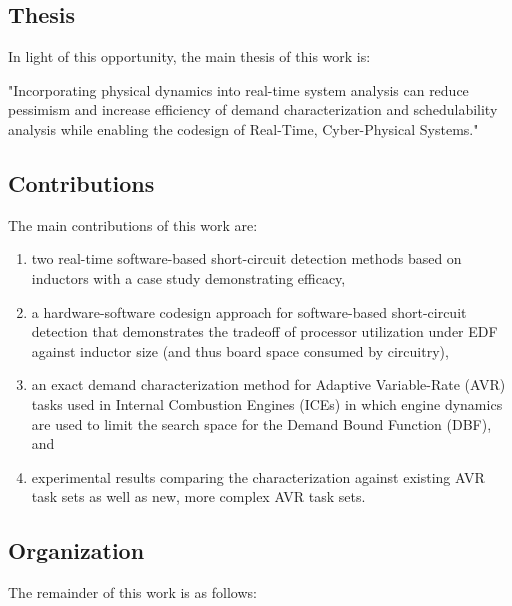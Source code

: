 \subsection{Thesis}

In light of this opportunity, the main thesis of this work is:

"Incorporating physical dynamics into real-time system analysis can reduce pessimism and increase efficiency of demand characterization and schedulability analysis while enabling the codesign of Real-Time, Cyber-Physical Systems." 

\subsection{Contributions}

The main contributions of this work are:
\begin{enumerate}
    \item two real-time software-based short-circuit detection methods based on inductors with a case study demonstrating efficacy,
    \item a hardware-software codesign approach for software-based short-circuit detection that demonstrates the tradeoff of processor utilization under EDF against inductor size (and thus board space consumed by circuitry),
    \item an exact demand characterization method for Adaptive Variable-Rate (AVR) tasks used in Internal Combustion Engines (ICEs) in which engine dynamics are used to limit the search space for the Demand Bound Function (DBF), and
    \item experimental results comparing the characterization against existing AVR task sets as well as new, more complex AVR task sets.
\end{enumerate}

\subsection{Organization}

The remainder of this work is as follows:

